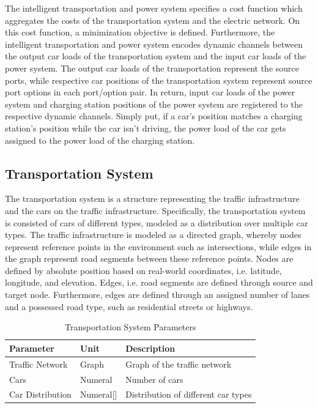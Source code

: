 The intelligent transportation and power system specifies a cost function which aggregates the costs of the transportation system and the electric network. On this cost function, a minimization objective is defined. Furthermore, the intelligent transportation and power system encodes dynamic channels between the output car loads of the transportation system and the input car loads of the power system. The output car loads of the transportation represent the source ports, while respective car positions of the transportation system represent source port options in each port/option pair. In return, input car loads of the power system and charging station positions of the power system are registered to the respective dynamic channels. Simply put, if a car's position matches a charging station's position while the car isn't driving, the power load of the car gets assigned to the power load of the charging station.

\subsection{Transportation System}

The transportation system is a structure representing the traffic infrastructure and the cars on the traffic infrastructure. Specifically, the transportation system is consisted of cars of different types, modeled as a distribution over multiple car types. The traffic infrastructure is modeled as a directed graph, whereby nodes represent reference points in the environment such as intersections, while edges in the graph represent road segments between these reference points. Nodes are defined by absolute position based on real-world coordinates, i.e. latitude, longitude, and elevation. Edges, i.e. road segments are defined through source and target node. Furthermore, edges are defined through an assigned number of lanes and a possessed road type, such as residential streets or highways.

\begin{table}[h]
	\renewcommand{\arraystretch}{1.3}
	\caption{Transportation System Parameters}
	\centering
	\begin{tabular}{lll}
		\hline
		\textbf{Parameter}              & \textbf{Unit}		 & \textbf{Description} \\ \hline
		Traffic Network                 & Graph          	 & Graph of the traffic network      \\
		Cars                  			& Numeral   		 & Number of cars      \\ 
		Car Distribution                & Numeral[]   		 & Distribution of different car types      \\ \hline
	\end{tabular}
\end{table}

